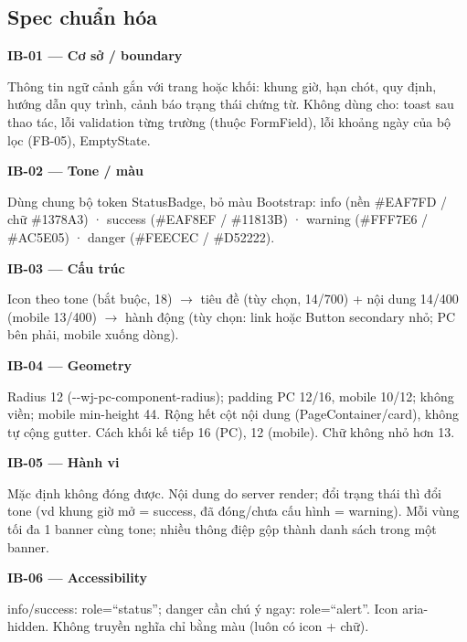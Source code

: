 \documentclass[11pt,a4paper]{report}
\begin{document}
\subsection*{Spec chuẩn hóa}
\par\smallskip\textbf{IB-01 — Cơ sở / boundary}\par
Thông tin ngữ cảnh gắn với trang hoặc khối: khung giờ, hạn chót, quy định, hướng dẫn quy trình, cảnh báo trạng thái chứng từ. Không dùng cho: toast sau thao tác, lỗi validation từng trường (thuộc FormField), lỗi khoảng ngày của bộ lọc (FB-05), EmptyState.\par

\par\smallskip\textbf{IB-02 — Tone / màu}\par
Dùng chung bộ token StatusBadge, bỏ màu Bootstrap: info (nền \#EAF7FD / chữ \#1378A3) · success (\#EAF8EF / \#11813B) · warning (\#FFF7E6 / \#AC5E05) · danger (\#FEECEC / \#D52222).\par

\par\smallskip\textbf{IB-03 — Cấu trúc}\par
Icon theo tone (bắt buộc, 18) \(\to\) tiêu đề (tùy chọn, 14/\allowbreak{}700) + nội dung 14/\allowbreak{}400 (mobile 13/\allowbreak{}400) \(\to\) hành động (tùy chọn: link hoặc Button secondary nhỏ; PC bên phải, mobile xuống dòng).\par

\par\smallskip\textbf{IB-04 — Geometry}\par
Radius 12 (-\kern0pt-\allowbreak{}wj-\allowbreak{}pc-\allowbreak{}component-\allowbreak{}radius); padding PC 12/\allowbreak{}16, mobile 10/\allowbreak{}12; không viền; mobile min-\allowbreak{}height 44. Rộng hết cột nội dung (PageContainer/\allowbreak{}card), không tự cộng gutter. Cách khối kế tiếp 16 (PC), 12 (mobile). Chữ không nhỏ hơn 13.\par

\par\smallskip\textbf{IB-05 — Hành vi}\par
Mặc định không đóng được. Nội dung do server render; đổi trạng thái thì đổi tone (vd khung giờ mở = success, đã đóng/\allowbreak{}chưa cấu hình = warning). Mỗi vùng tối đa 1 banner cùng tone; nhiều thông điệp gộp thành danh sách trong một banner.\par

\par\smallskip\textbf{IB-06 — Accessibility}\par
info/\allowbreak{}success: role=“status”; danger cần chú ý ngay: role=“alert”. Icon aria-\allowbreak{}hidden. Không truyền nghĩa chỉ bằng màu (luôn có icon + chữ).\par
\end{document}
